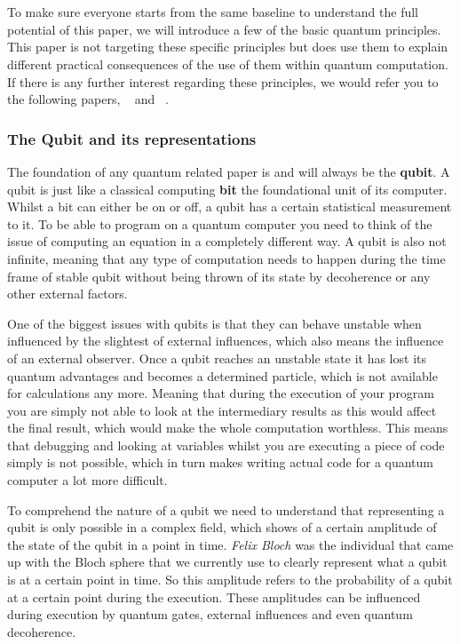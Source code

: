 \chapter{}
\label{ch:quantum-essentials}

To make sure everyone starts from the same baseline to understand the full potential of this paper, we will introduce a few of the basic quantum principles. This paper is not targeting these specific principles but does use them to explain different practical consequences of the use of them within quantum computation. If there is any further interest regarding these principles, we would refer you to the following papers, ~\textcite{Rieffel1998} and ~\textcite{Shor2000}.

\subsection{The Qubit and its representations}

The foundation of any quantum related paper is and will always be the \textbf{qubit}. A qubit is just like a classical computing \textbf{bit} the foundational unit of its computer. Whilst a bit can either be on or off, a qubit has a certain statistical measurement to it. To be able to program on a quantum computer you need to think of the issue of computing an equation in a completely different way. A qubit is also not infinite, meaning that any type of computation needs to happen during the time frame of stable qubit without being thrown of its state by decoherence or any other external factors. 

One of the biggest issues with qubits is that they can behave unstable when influenced by the slightest of external influences, which also means the influence of an external observer. Once a qubit reaches an unstable state it has lost its quantum advantages and becomes a determined particle, which is not available for calculations any more. Meaning that during the execution of your program you are simply not able to look at the intermediary results as this would affect the final result, which would make the whole computation worthless. This means that debugging and looking at variables whilst you are executing a piece of code simply is not possible, which in turn makes writing actual code for a quantum computer a lot more difficult. 

To comprehend the nature of a qubit we need to understand that representing a qubit is only possible in a complex field, which shows of a certain amplitude of the state of the qubit in a point in time. \textit{Felix Bloch} was the individual that came up with the Bloch sphere that we currently use to clearly represent what a qubit is at a certain point in time.
So this amplitude refers to the probability of a qubit at a certain point during the execution. These amplitudes can be influenced during execution by quantum gates, external influences and even quantum decoherence.

